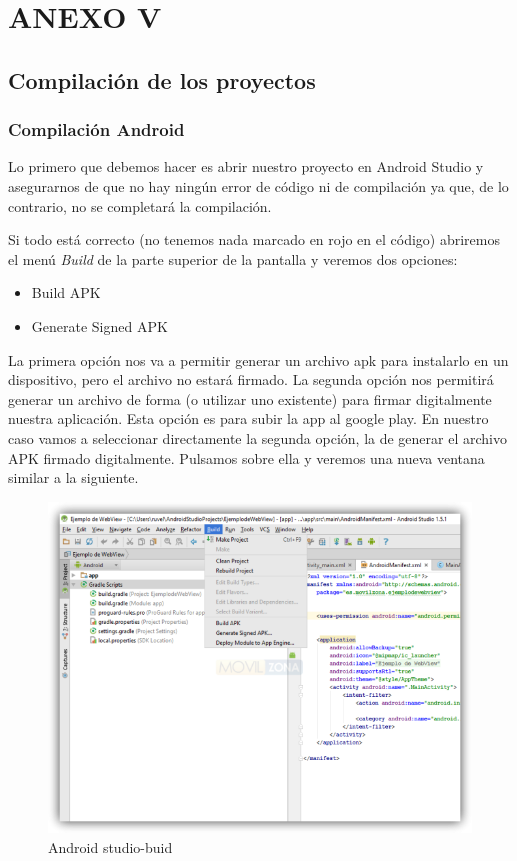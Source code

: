 \chapter{ANEXO V}

\section{Compilación de los proyectos}

\subsection{Compilación Android}

Lo primero que debemos hacer es abrir nuestro proyecto en Android Studio y asegurarnos de que no hay ningún error de código ni de compilación ya que, de lo contrario, no se completará la compilación.

Si todo está correcto (no tenemos nada marcado en rojo en el código) abriremos el menú \textit{Build} de la parte superior de la pantalla y veremos dos opciones:

\begin{itemize}
	\item Build APK
	\item Generate Signed APK
\end{itemize}	

La primera opción nos va a permitir generar un archivo apk para instalarlo en un dispositivo, pero el archivo no estará firmado. La segunda opción nos permitirá generar un archivo de forma (o utilizar uno existente) para firmar digitalmente nuestra aplicación. Esta opción es para  subir la app al google play.
En nuestro caso vamos a seleccionar directamente la segunda opción, la de generar el archivo APK firmado digitalmente. Pulsamos sobre ella y veremos una nueva ventana similar a la siguiente.

\begin{figure}[H]
	\centering
	\includegraphics[width=0.7\linewidth]{figuras/build-1}
	\caption{Android studio-buid}
	\label{fig:bld1}
\end{figure}


